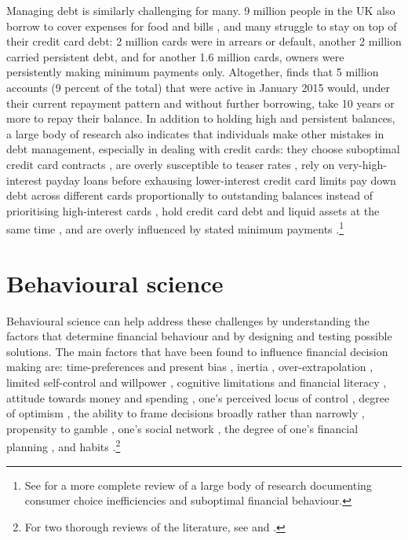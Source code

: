Managing debt is similarly challenging for many. 9 million people in the UK
also borrow to cover expenses for food and bills \citep{mps2018building}, and
many struggle to stay on top of their credit card debt: 2 million cards were in
arrears or default, another 2 million carried persistent debt, and for another
1.6 million cards, owners were persistently making minimum payments only.
Altogether, \citet{fca2016credit} finds that 5 million accounts (9 percent of the total)
that were active in January 2015 would, under their current repayment pattern
and without further borrowing, take 10 years or more to repay their balance. In addition to holding high and persistent balances, a
large body of research also indicates that individuals make other mistakes in
debt management, especially in dealing with credit cards: they choose
suboptimal credit card contracts \citep{agarwal2015consumers}, are overly susceptible to teaser rates \citep{shui2004time, ausubel1991failure}, rely on very-high-interest payday loans before exhausing lower-interest credit card limits \citep{agarwal2009payday} pay down debt across different cards proportionally to outstanding balances instead of prioritising
high-interest cards \citep{gathergood2019individuals}, hold
credit card debt and liquid assets at the same time \citep{gross2002liquidity,
    gathergood2020co}, and are overly influenced by stated minimum payments \citep{sakaguchi2022default}.\footnote{See \citet{agarwal2017shapes} for a more
    complete review of a large body of research documenting consumer choice
inefficiencies and suboptimal financial behaviour.} 


\section{Behavioural science}

Behavioural science can help address these challenges by understanding the
factors that determine financial behaviour and by designing and testing
possible solutions. The main factors that have been found to influence
financial decision making are: time-preferences and present bias
\citep{laibson1997golden, frederick2002time, read2018intertemporal,
ericson2019intertemporal, cohen2020measuring}, inertia
\citep{madrian2001power}, over-extrapolation \citep{choi2009reinforcement},
limited self-control and willpower \citep{thaler1981economic,
benhabib2005modeling, fudenberg2006dual, loewenstein2004animal,
gul2001temptation}, cognitive limitations and financial literacy
\citep{agarwal2009age, agarwal2013cognitive, korniotis2011older,
agarwal2010learning, fernandes2014financial, jorring2020financial}, attitude
towards money and spending \citep{rick2008tightwads, rick2011fatal}, one's
perceived locus of control \citep{perry2005control}, degree of optimism
\citep{puri2007optimism}, the ability to frame decisions broadly rather than
narrowly \citep{kumar2008decision}, propensity to gamble
\citep{kumar2009gambles}, one's social network \citep{bailey2018economic,
kuchler2021social}, the degree of one's financial planning
\citep{ameriks2003wealth}, and habits \citep{blumenstock2018defaults,
schaner2018persistent, de2013deposit}.\footnote{For two thorough reviews of the
literature, see \citet{agarwal2017shapes} and \citet{greenberg2019financial}.}

